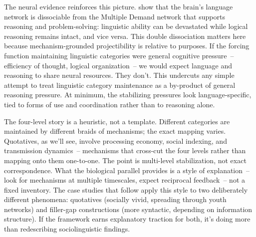 The neural evidence reinforces this picture. \textcite{Fedorenko2024} show that the brain's language network is dissociable from the Multiple Demand network that supports reasoning and problem-solving: linguistic ability can be devastated while logical reasoning remains intact, and vice versa. This double dissociation matters here because mechanism-grounded projectibility is relative to purposes. If the forcing function maintaining linguistic categories were general cognitive pressure~-- efficiency of thought, logical organization~-- we would expect language and reasoning to share neural resources. They don't. This undercuts any simple attempt to treat linguistic category maintenance as a by-product of general reasoning pressure. At minimum, the stabilizing pressures look language-specific, tied to forms of use and coordination rather than to reasoning alone.

The four-level story is a heuristic, not a template. Different categories are maintained by different braids of mechanisms; the exact mapping varies. Quotatives, as we'll see, involve processing economy, social indexing, and transmission dynamics~-- mechanisms that cross-cut the four levels rather than mapping onto them one-to-one. The point is multi-level stabilization, not exact correspondence. What the biological parallel provides is a style of explanation~-- look for mechanisms at multiple timescales, expect reciprocal feedback~-- not a fixed inventory. The case studies that follow apply this style to two deliberately different phenomena: quotatives (socially vivid, spreading through youth networks) and filler-gap constructions (more syntactic, depending on information structure). If the framework earns explanatory traction for both, it's doing more than redescribing sociolinguistic findings.

